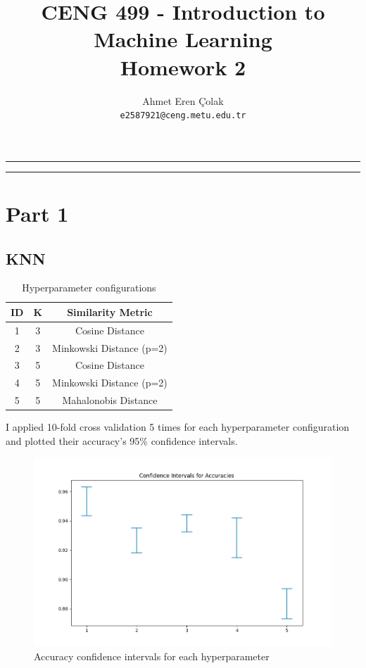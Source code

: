 \documentclass[12pt,a4paper, margin=1in]{article}
\author{
    Ahmet Eren Çolak\\
    \texttt{e2587921@ceng.metu.edu.tr}
}
\title{ 
    \textbf{CENG 499 - Introduction to Machine Learning} \\ Homework 2
}
\begin{document}
\maketitle

\noindent\rule{19cm}{1.2pt}

\tableofcontents

\bigskip
\noindent\rule{19cm}{1.2pt}


\section{Part 1}

\subsection{KNN}

\begin{table}[H]
    \centering
    \begin{tabular}{|c|c|c|}
    \hline
    \textbf{ID} & \textbf{K} & \textbf{Similarity Metric} \\ \hline
    1           & 3          & Cosine Distance            \\ \hline
    2           & 3          & Minkowski Distance (p=2)   \\ \hline
    3           & 5          & Cosine Distance            \\ \hline
    4           & 5          & Minkowski Distance (p=2)   \\ \hline
    5           & 5          & Mahalonobis Distance       \\ \hline
    \end{tabular}
    \caption{Hyperparameter configurations}
\end{table}

I applied 10-fold cross validation 5 times for each hyperparameter configuration and plotted their accuracy's 95\% confidence intervals.

\begin{figure}[H]
    \centering
    \includegraphics[scale=0.75]{confidence_intervals}
    \caption{Accuracy confidence intervals for each hyperparameter}
\end{figure}
\end{document}
